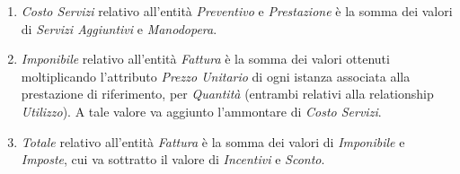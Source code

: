 			{\color{red}{Da correggere di qui in poi.}}
			
			\begin{enumerate}
			
				\item \emph{Costo Servizi} relativo all'entità \emph{Preventivo} e \emph{Prestazione} è la somma dei valori di \emph{Servizi Aggiuntivi} e \emph{Manodopera}.
				\item \emph{Imponibile} relativo all'entità \emph{Fattura} è la somma dei valori ottenuti moltiplicando l'attributo \emph{Prezzo Unitario} di ogni istanza associata alla prestazione di riferimento, per \emph{Quantità} (entrambi relativi alla relationship \emph{Utilizzo}). A tale valore va aggiunto l'ammontare di \emph{Costo Servizi}.
				\item \emph{Totale} relativo all'entità \emph{Fattura} è la somma dei valori di \emph{Imponibile} e \emph{Imposte}, cui va sottratto il valore di \emph{Incentivi} e \emph{Sconto}.
				
			\end{enumerate}
